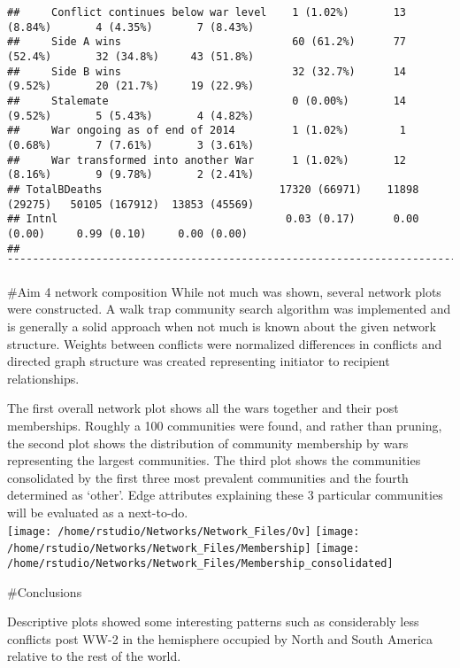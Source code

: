 \documentclass[
]{article}
\begin{document}
\begin{verbatim}
##     Conflict continues below war level    1 (1.02%)       13 (8.84%)       4 (4.35%)       7 (8.43%)   
##     Side A wins                           60 (61.2%)      77 (52.4%)       32 (34.8%)     43 (51.8%)   
##     Side B wins                           32 (32.7%)      14 (9.52%)       20 (21.7%)     19 (22.9%)   
##     Stalemate                             0 (0.00%)       14 (9.52%)       5 (5.43%)       4 (4.82%)   
##     War ongoing as of end of 2014         1 (1.02%)        1 (0.68%)       7 (7.61%)       3 (3.61%)   
##     War transformed into another War      1 (1.02%)       12 (8.16%)       9 (9.78%)       2 (2.41%)   
## TotalBDeaths                            17320 (66971)    11898 (29275)   50105 (167912)  13853 (45569) 
## Intnl                                    0.03 (0.17)      0.00 (0.00)     0.99 (0.10)     0.00 (0.00)  
## ¯¯¯¯¯¯¯¯¯¯¯¯¯¯¯¯¯¯¯¯¯¯¯¯¯¯¯¯¯¯¯¯¯¯¯¯¯¯¯¯¯¯¯¯¯¯¯¯¯¯¯¯¯¯¯¯¯¯¯¯¯¯¯¯¯¯¯¯¯¯¯¯¯¯¯¯¯¯¯¯¯¯¯¯¯¯¯¯¯¯¯¯¯¯¯¯¯¯¯¯¯¯
\end{verbatim}

\#Aim 4 network composition While not much was shown, several network
plots were constructed. A walk trap community search algorithm was
implemented and is generally a solid approach when not much is known
about the given network structure. Weights between conflicts were
normalized differences in conflicts and directed graph structure was
created representing initiator to recipient relationships.

The first overall network plot shows all the wars together and their
post memberships. Roughly a 100 communities were found, and rather than
pruning, the second plot shows the distribution of community membership
by wars representing the largest communities. The third plot shows the
communities consolidated by the first three most prevalent communities
and the fourth determined as `other'. Edge attributes explaining these 3
particular communities will be evaluated as a next-to-do.\\

\texttt{[image: /home/rstudio/Networks/Network\_Files/Ov]}
\texttt{[image: /home/rstudio/Networks/Network\_Files/Membership]}
\texttt{[image: /home/rstudio/Networks/Network\_Files/Membership\_consolidated]}

\#Conclusions

Descriptive plots showed some interesting patterns such as considerably
less conflicts post WW-2 in the hemisphere occupied by North and South
America relative to the rest of the world.\\
\end{document}
